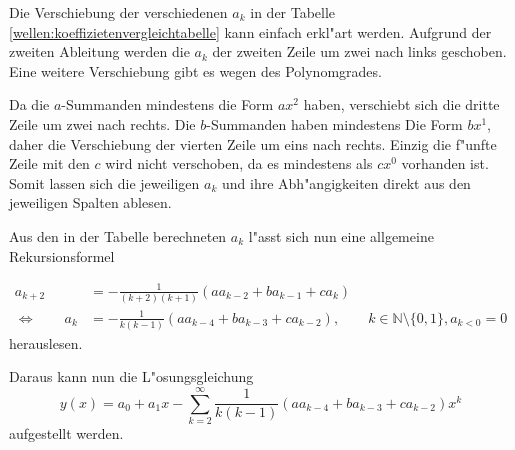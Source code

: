 Die Verschiebung der verschiedenen $a_k$ in der Tabelle 
\ref{wellen:koeffizietenvergleichtabelle} kann einfach erkl"art werden. 
Aufgrund der zweiten Ableitung werden die $a_k$ der zweiten Zeile um zwei nach 
links geschoben. Eine weitere Verschiebung gibt es wegen des Polynomgrades.

Da die $a$-Summanden mindestens die Form $ax^2$ haben, verschiebt sich die 
dritte Zeile um zwei nach rechts. Die $b$-Summanden haben mindestens Die Form 
$bx^1$, daher die Verschiebung der vierten Zeile um eins nach rechts. Einzig 
die f"unfte Zeile mit den $c$ wird nicht verschoben, da es mindestens als 
$cx^0$ vorhanden ist. Somit lassen sich die jeweiligen $a_k$ und ihre 
Abh"angigkeiten direkt aus den jeweiligen Spalten ablesen.

Aus den in der Tabelle berechneten $a_k$ l"asst sich nun eine allgemeine 
Rekursionsformel

\begin{equation*}
	\begin{split}
		a_{k+2} &= -\frac{1}{(k+2)(k+1)} (aa_{k-2}+ba_{k-1}+ca_k) \\
		\Leftrightarrow \qquad
		a_k &= -\frac{1}{k(k-1)} (aa_{k-4}+ba_{k-3}+ca_{k-2}), \qquad k \in 
		\mathbb{N} \setminus \{0, 1\}, a_{k<0} = 0
	\end{split}
\end{equation*}
herauslesen. 

Daraus kann nun die L"osungsgleichung
\begin{equation}
	y(x) = a_0 + a_1x 
	-\sum_{k=2}^{\infty}\frac{1}{k(k-1)}(aa_{k-4}+ba_{k-3}+ca_{k-2})x^k
	\label{wellen:ygleichung}
\end{equation}
aufgestellt werden.